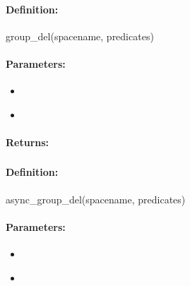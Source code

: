 \paragraph{Definition:}
\begin{rubycode}
group_del(spacename, predicates)
\end{rubycode}

\paragraph{Parameters:}
\begin{itemize}[noitemsep]
\item {}\\

\item {}\\

\end{itemize}

\paragraph{Returns:}


\pagebreak
\subsubsection{}
\label{api:ruby:async_group_del}


\paragraph{Definition:}
\begin{rubycode}
async_group_del(spacename, predicates)
\end{rubycode}

\paragraph{Parameters:}
\begin{itemize}[noitemsep]
\item {}\\

\item {}\\

\end{itemize}

